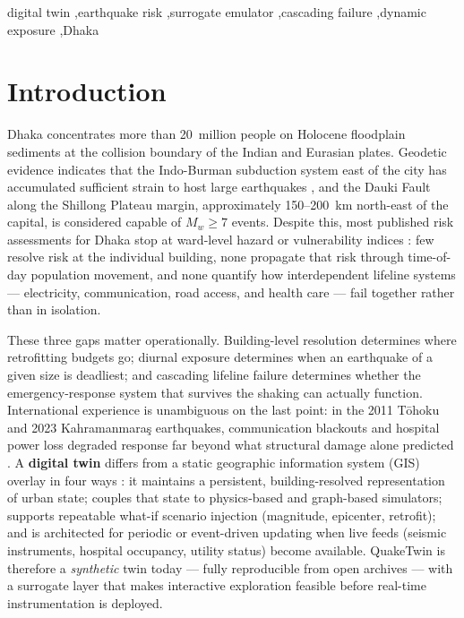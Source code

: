 \documentclass[a4paper,fleqn]{cas-sc}
\begin{document}
\begin{keywords}
digital twin \sep earthquake risk \sep surrogate emulator \sep cascading
failure \sep dynamic exposure \sep Dhaka
\end{keywords}

{\hfuzz=120pt\maketitle}

\section{Introduction}
Dhaka concentrates more than 20~million people on Holocene floodplain
sediments at the collision boundary of the Indian and Eurasian plates.
Geodetic evidence indicates that the Indo-Burman subduction system east of
the city has accumulated sufficient strain to host large earthquakes
\cite{steckler2016}, and the Dauki Fault along the Shillong Plateau margin,
approximately 150--200~km north-east of the capital, is considered capable
of $M_w \geq 7$ events. Despite this, most published risk assessments for
Dhaka stop at ward-level hazard or vulnerability indices
\cite{cdmp2009,islam2020}: few resolve risk at the individual building, none
propagate that risk through time-of-day population movement, and none
quantify how interdependent lifeline systems --- electricity, communication,
road access, and health care --- fail together rather than in isolation.

These three gaps matter operationally. Building-level resolution determines
where retrofitting budgets go; diurnal exposure determines when an
earthquake of a given size is deadliest; and cascading lifeline failure
determines whether the emergency-response system that survives the shaking
can actually function. International experience is unambiguous on the last
point: in the 2011 T\=ohoku and 2023 Kahramanmara\c{s} earthquakes,
communication blackouts and hospital power loss degraded response far beyond
what structural damage alone predicted \cite{ouyang2014}. A \textbf{digital
twin} differs from a static geographic information system (GIS) overlay in
four ways \cite{ford2020,hamilton2024udt}: it maintains a persistent,
building-resolved representation of urban state; couples that state to
physics-based and graph-based simulators; supports repeatable what-if
scenario injection (magnitude, epicenter, retrofit); and is architected for
periodic or event-driven updating when live feeds (seismic instruments,
hospital occupancy, utility status) become available. QuakeTwin is therefore
a \textit{synthetic} twin today --- fully reproducible from open archives ---
with a surrogate layer that makes interactive exploration feasible before
real-time instrumentation is deployed.
\end{document}

